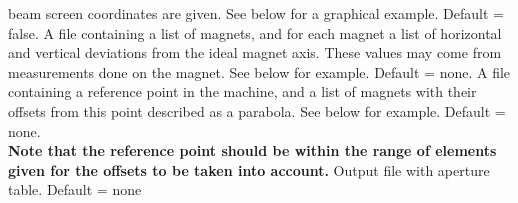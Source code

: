 \begin{5.02.04}
\begin{madlist}
     beam screen coordinates are given. See below for a graphical
     example. Default = false.  
    A file containing a list of magnets, and for each
     magnet a list of horizontal and vertical deviations from the ideal
     magnet axis. These values may come from measurements done on the
     magnet. See below for example. Default = none.  
    A file containing a reference point in the machine,
     and a list of magnets with their offsets from this point described
     as a parabola. See below for example. Default = none. \\
     {\bf Note that the reference point should be within the range of
       elements given for the offsets to be taken into account.}
    Output file with aperture table. Default = none 
\end{madlist}
\end{5.02.04}

